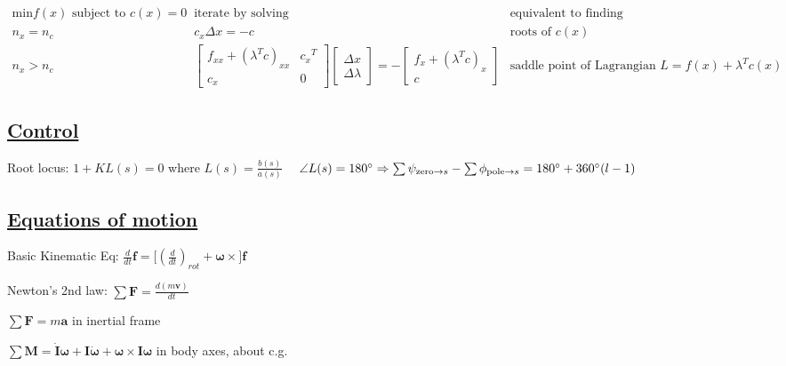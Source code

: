 \documentclass[11pt,landscape]{article}
\begin{document}
$
\begin{matrix}

\text{min} f(x) \text{ subject to } c(x)=0
 & \text{iterate by solving} & \text{equivalent to finding} \\

n_x = n_c & c_x \Delta x = -c &
\text{roots of } c(x)\\

n_x > n_c & 
\begin{bmatrix} 
f_{xx} + (\lambda^T c)_{xx} & {c_x}^T \\ c_x & 0
\end{bmatrix} 
\begin{bmatrix} 
\Delta x \\ \Delta \lambda
\end{bmatrix} 
= -
\begin{bmatrix} 
f_x + (\lambda^T c)_x \\ c
\end{bmatrix} 
&
\text{saddle point of Lagrangian } L = f(x)+\lambda^T c(x)

\end{matrix}
$



\subsection{\underline{Control}}

Root locus:
$1+K L(s) = 0$ where $L(s)=\frac{b(s)}{a(s)}$
$\quad \angle L(s) = 180\degree \Rightarrow 
\sum \psi_{\text{zero}\rightarrow s} - 
\sum \phi_{\text{pole}\rightarrow s} 
= 180\degree + 360\degree(l-1)$


\newpage
\subsection{\underline{Equations of motion}}

\everymath{\displaystyle}

Basic Kinematic Eq:
$\frac{d}{dt} \bm f = \big[ (\frac{d}{dt})_{rot} + \bm\omega \times \big] \bm f$

Newton's 2nd law:
$\sum \bm F = \frac{d(m \bm v)}{dt}$

$\sum \bm F = m \bm a$ \quad in inertial frame

$\sum \bm M = 
\dot{\bm I} \bm\omega + \bm I \dot{\bm\omega} + \bm\omega \times \bm I \bm\omega$
\quad in body axes, about c.g.
\end{document}
